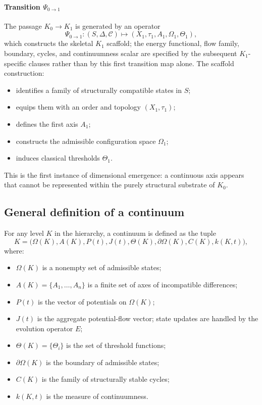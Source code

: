 \paragraph{Transition \texorpdfstring{$\Psi_{0\to 1}$}{Psi\_0\_to\_1}}
The passage \(K_0 \to K_1\) is generated by an operator
\[
    \Psi_{0\to 1} : (S,\Delta,\mathcal{C}) \mapsto (X_1,\tau_1,A_1,\Omega_1,\Theta_1),
\]
which constructs the skeletal \(K_1\) scaffold; the energy functional,
flow family, boundary, cycles, and continuumness scalar are specified by the
subsequent \(K_1\)-specific clauses rather than by this first transition map
alone.
The scaffold construction:
\begin{itemize}
    \item identifies a family of structurally compatible states in \(S\);
    \item equips them with an order and topology \((X_1,\tau_1)\);
    \item defines the first axis \(A_1\);
    \item constructs the admissible configuration space \(\Omega_1\);
    \item induces classical thresholds \(\Theta_1\).
\end{itemize}
This is the first instance of dimensional emergence: a continuous axis appears that cannot be represented within the purely structural substrate of \(K_0\).

\subsection{General definition of a continuum}

For any level \(K\) in the hierarchy, a continuum is defined as the tuple
\[
    K = \big(\Omega(K), A(K), P(t), J(t), \Theta(K), \partial\Omega(K), C(K), k(K,t)\big),
\]
where:
\begin{itemize}
    \item \(\Omega(K)\) is a nonempty set of admissible states;
    \item \(A(K) = \{A_1,\dots,A_n\}\) is a finite set of axes of incompatible differences;
    \item \(P(t)\) is the vector of potentials on \(\Omega(K)\);
    \item \(J(t)\) is the aggregate potential-flow vector; state updates are
          handled by the evolution operator \(E\);
    \item \(\Theta(K) = \{\Theta_i\}\) is the set of threshold functions;
    \item \(\partial\Omega(K)\) is the boundary of admissible states;
    \item \(C(K)\) is the family of structurally stable cycles;
    \item \(k(K,t)\) is the measure of continuumness.
\end{itemize}


